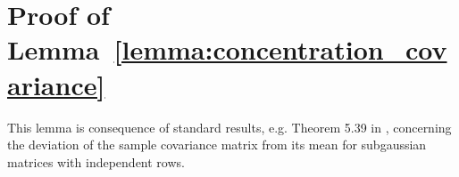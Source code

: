 \section{Proof of Lemma~\ref{lemma:concentration_covariance}}\label{appdx:concentration_covariance}
This lemma is consequence of standard results, e.g. Theorem 5.39 in \cite{Vershynin2012nonasymptoticmatrices}, concerning the deviation of the sample covariance matrix from its mean for subgaussian matrices with independent rows.\\
	
